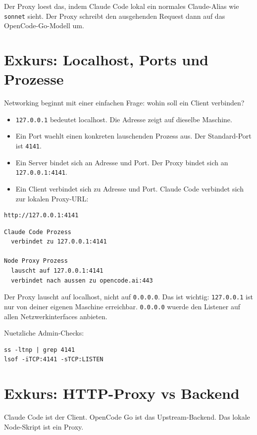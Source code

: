 \documentclass[11pt,a4paper]{article}
\newcommand{\code}[1]{\texttt{#1}}
\begin{document}
Der Proxy loest das, indem Claude Code lokal ein normales Claude-Alias wie
\code{sonnet} sieht. Der Proxy schreibt den ausgehenden Request dann auf das
OpenCode-Go-Modell um.

\section{Exkurs: Localhost, Ports und Prozesse}

Networking beginnt mit einer einfachen Frage: wohin soll ein Client verbinden?

\begin{itemize}
  \item \code{127.0.0.1} bedeutet localhost. Die Adresse zeigt auf dieselbe Maschine.
  \item Ein Port waehlt einen konkreten lauschenden Prozess aus. Der Standard-Port ist \code{4141}.
  \item Ein Server bindet sich an Adresse und Port. Der Proxy bindet sich an \code{127.0.0.1:4141}.
  \item Ein Client verbindet sich zu Adresse und Port. Claude Code verbindet sich zur lokalen Proxy-URL:
\end{itemize}

\begin{verbatim}
http://127.0.0.1:4141
\end{verbatim}

\begin{verbatim}
Claude Code Prozess
  verbindet zu 127.0.0.1:4141

Node Proxy Prozess
  lauscht auf 127.0.0.1:4141
  verbindet nach aussen zu opencode.ai:443
\end{verbatim}

Der Proxy lauscht auf localhost, nicht auf \code{0.0.0.0}. Das ist wichtig:
\code{127.0.0.1} ist nur von deiner eigenen Maschine erreichbar.
\code{0.0.0.0} wuerde den Listener auf allen Netzwerkinterfaces anbieten.

Nuetzliche Admin-Checks:

\begin{verbatim}
ss -ltnp | grep 4141
lsof -iTCP:4141 -sTCP:LISTEN
\end{verbatim}

\section{Exkurs: HTTP-Proxy vs Backend}

Claude Code ist der Client. OpenCode Go ist das Upstream-Backend. Das lokale
Node-Skript ist ein Proxy.
\end{document}
